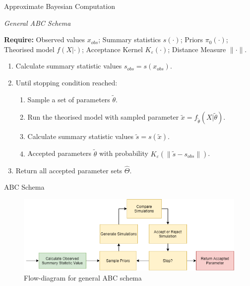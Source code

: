 \documentclass[aspectratio=169]{beamer}
\begin{document}
\begin{frame}{Approximate Bayesian Computation}
  \par \textit{General ABC Schema}
  \par\textbf{Require:} Observed values $x_{obs}$; Summary statistics $s(\cdot)$; Priors $\pi_0(\cdot)$; Theorised model $f(X|\cdot)$; Acceptance Kernel $K_\varepsilon(\cdot)$; Distance Measure $\|\cdot\|$.
  \begin{enumerate}
    \item Calculate summary statistic values $s_{obs}=s(x_{obs})$.
    \item Until stopping condition reached:
    \begin{enumerate}
      \item Sample a set of parameters $\tilde\theta$.
      \item Run the theorised model with sampled parameter $\tilde{x}=f_{\tilde\theta}(X|\tilde\theta)$.
      \item Calculate summary statistic values $\tilde{s}=s(\tilde{x})$.
      \item Accepted parameters $\tilde\theta$ with probability $K_\varepsilon(\|\tilde{s}-s_{obs}\|)$.
    \end{enumerate}
    \item Return all accepted parameter sets $\hat\Theta$.
  \end{enumerate}
\end{frame}

\begin{frame}{ABC Schema}
  \begin{figure}[H]
    \centering\includegraphics[width=1\textwidth]{ABC_flow.png}
    \caption{Flow-diagram for general ABC schema}
  \end{figure}
\end{frame}
\end{document}
